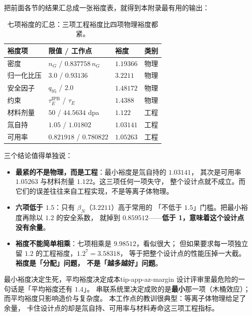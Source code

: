 把前面各节的结果汇总成一张裕度表，就得到本附录最有用的输出：

\begin{table}[htbp]
\centering
\small
\setlength{\tabcolsep}{4pt}
\caption{七项裕度的汇总：三项工程裕度比四项物理裕度都紧。}
\label{tab:app-az-margin}
\begin{tabular}{p{3.8cm}p{3.4cm}p{2.6cm}p{2.2cm}}
\toprule
裕度项 & 限值 / 工作点 & 裕度 & 类别 \\
\midrule
密度 & $n_G$ / $0.837758\,n_G$ & $1.19366$ & 物理 \\
归一化比压 & $3.0$ / $0.93136$ & $3.2211$ & 物理 \\
安全因子 & $q_{95}$ / $2.0$ & $1.48172$ & 物理 \\
约束 & $\tau_E^\mathrm{IPB}$ / $\tau_E$ & $1.4388$ & 物理 \\
材料剂量 & $50$ / $44.5634$ dpa & $1.122$ & 工程 \\
氚自持 & $1.05$ / $1.01802$ & $1.03141$ & 工程 \\
可用率 & $0.821918$ / $0.780822$ & $1.05263$ & 工程 \\
\bottomrule
\end{tabular}

\end{table}

三个结论值得单独说：

\begin{itemize}
\item \textbf{最紧的不是物理，而是工程}：最小裕度是氚自持的 $1.03141$，
  其次是可用率 $1.05263$ 与材料剂量 $1.122$。这三项任何一项失守，
  整个设计点就不成立。而它们的误差往往来自工程实现，不是等离子体物理。
\item \textbf{六项低于 $1.5$}：只有 $\beta_N$（$3.2211$）高于常用的
  「不低于 $1.5$」门槛。把最小裕度再除以 $1.2$ 的安全系数，
  就掉到 $0.859512$——\textbf{低于 1，意味着这个设计点没有余量}。
\item \textbf{裕度不能简单相乘}：七项相乘是 $9.98512$，看似很大；
  但如果要求每一项独立留 $1.2$ 的工程裕度，$1.2^7=3.58318$，
  等于把整个设计点的性能压掉一大截。\textbf{裕度是「分配」问题，
  不是「越多越好」问题}。
\end{itemize}

\begin{tip}{最小裕度决定生死，平均裕度决定成本}{tip-app-az-margin}
设计评审里最危险的一句话是「平均裕度还有 $1.4$」。
串联系统里决定成败的是\textbf{最小}那一项（木桶效应）；
而平均裕度只影响造价与复杂度。
本工作点的教训很典型：等离子体物理给足了余量，
卡住设计点的却是氚自持、可用率与材料寿命这三项工程指标。
\end{tip}


